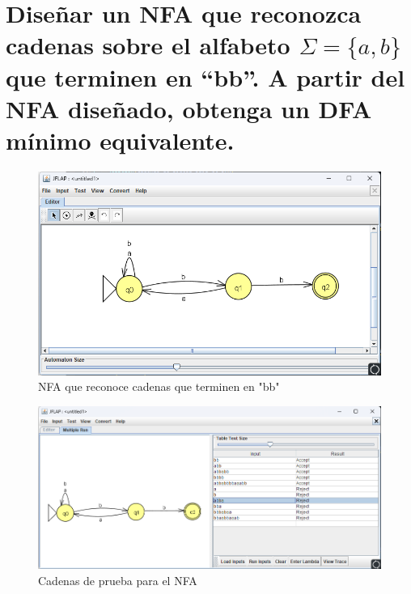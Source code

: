 \documentclass[11pt]{report}
\begin{document}
\section{Diseñar un NFA que reconozca cadenas sobre el alfabeto $\Sigma = \{a, b\}$ que terminen en “bb”. A partir del NFA diseñado, obtenga un DFA mínimo equivalente.}
\begin{figure}[H]
  \centering
  \includegraphics[scale=0.6]{img/NFA_02.png}
  \caption{NFA que reconoce cadenas que terminen en "bb"}
\end{figure}

\begin{figure}[H]
  \centering
  \includegraphics[scale=0.6]{img/NFA_02_test.png}
  \caption{Cadenas de prueba para el NFA}
\end{figure}

\newpage
\end{document}
